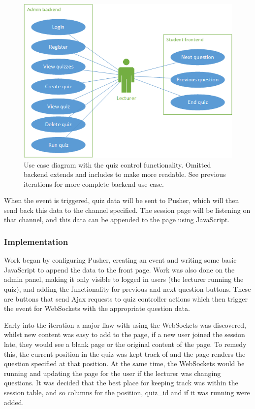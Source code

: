\begin{figure}
	\caption{Use case diagram with the quiz control functionality. Omitted backend extends and includes to make more readable. See previous iterations for more complete backend use case.}
	\centerline{\includegraphics{Chapter2/Iter-4/iter-4-use-case}}
	\label{fig:iter-4-use-case}
\end{figure}

When the event is triggered, quiz data will be sent to Pusher, which will then send back this data to the channel specified. The session page will be listening on that channel, and this data can be appended to the page using JavaScript.

\subsubsection{Implementation}
Work began by configuring Pusher, creating an event and writing some basic JavaScript to append the data to the front page. Work was also done on the admin panel, making it only visible to logged in users (the lecturer running the quiz), and adding the functionality for previous and next question buttons. These are buttons that send Ajax requests to quiz controller actions which then trigger the event for WebSockets with the appropriate question data.

Early into the iteration a major flaw with using the WebSockets was discovered, whilst new content was easy to add to the page, if a new user joined the session late, they would see a blank page or the original content of the page. To remedy this, the current position in the quiz was kept track of and the page renders the question specified at that position. At the same time, the WebSockets would be running and updating the page for the user if the lecturer was changing questions. It was decided that the best place for keeping track was within the session table, and so columns for the position, quiz\_id and if it was running were added.

